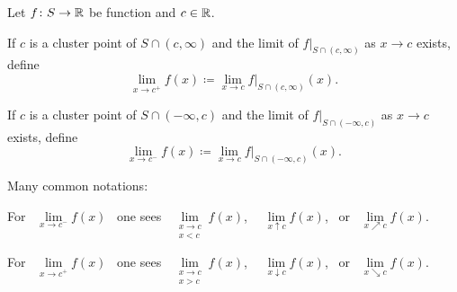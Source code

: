 \documentclass[10pt,aspectratio=149]{beamer}
\begin{document}
\begin{frame}

\begin{definition}
Let $f \colon S \to {\mathbb{R}}$ be function and $c \in {\mathbb{R}}$.

\pause
\medskip

If $c$ is a cluster point of $S \cap (c,\infty)$ and the limit
of $f|_{S \cap (c,\infty)}$ 
as $x \to c$ exists, define
\begin{equation*}
\lim_{x \to c^+} f(x) \coloneqq \lim_{x\to c} f|_{S \cap (c,\infty)}(x) .
\end{equation*}

\pause
If $c$ is a cluster point of 
$S \cap (-\infty,c)$ and the limit
of $f|_{S \cap (-\infty,c)}$ 
as $x \to c$ exists, define
\begin{equation*}
\lim_{x \to c^-} f(x) \coloneqq \lim_{x\to c} f|_{S \cap (-\infty,c)}(x) .
\end{equation*}
\end{definition}

\pause
Many common notations: 

\medskip

For
~$\lim\limits_{x \to c^-} f(x)$~ one sees
~$\lim\limits_{\substack{x \to c\\x < c}} f(x)$,~
~$\lim\limits_{x \uparrow c} f(x)$,~ or
~$\lim\limits_{x \nearrow c} f(x)$.

\medskip

For
~$\lim\limits_{x \to c^+} f(x)$~ one sees
~$\lim\limits_{\substack{x \to c\\x > c}} f(x)$,~
~$\lim\limits_{x \downarrow c} f(x)$,~ or
~$\lim\limits_{x \searrow c} f(x)$.


\end{frame}
\end{document}
